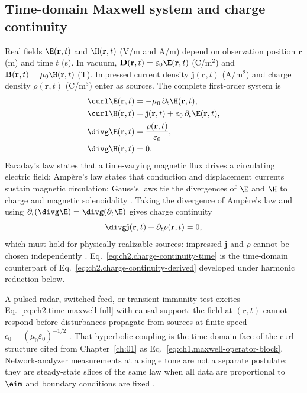 
\subsection{Time-domain Maxwell system and charge continuity}
\label{sec:ch02.2.3}

Real fields $\E(\mathbf{r},t)$ and $\H(\mathbf{r},t)$ (V/m and A/m) depend on observation position $\mathbf{r}$ (m) and time $t$ (s). In vacuum, $\mathbf{D}(\mathbf{r},t)=\varepsilon_0\E(\mathbf{r},t)$ (C/m$^2$) and $\mathbf{B}(\mathbf{r},t)=\mu_0\H(\mathbf{r},t)$ (T). Impressed current density $\mathbf{j}(\mathbf{r},t)$ (A/m$^2$) and charge density $\rho(\mathbf{r},t)$ (C/m$^3$) enter as sources. The complete first-order system is \cite{maxwell1873,stratton1941}
\begin{equation}
\label{eq:ch2.time-maxwell-full}
\begin{aligned}
\curl\E(\mathbf{r},t)&=-\mu_0\,\partial_t\H(\mathbf{r},t),\\
\curl\H(\mathbf{r},t)&=\mathbf{j}(\mathbf{r},t)+\varepsilon_0\,\partial_t\E(\mathbf{r},t),\\
\divg\E(\mathbf{r},t)&=\frac{\rho(\mathbf{r},t)}{\varepsilon_0},\\
\divg\H(\mathbf{r},t)&=0.
\end{aligned}
\end{equation}
Faraday's law states that a time-varying magnetic flux drives a circulating electric field; Amp\`ere's law states that conduction and displacement currents sustain magnetic circulation; Gauss's laws tie the divergences of $\E$ and $\H$ to charge and magnetic solenoidality \cite{maxwell1873}. Taking the divergence of Amp\`ere's law and using $\partial_t(\divg\E)=\divg(\partial_t\E)$ gives charge continuity
\begin{equation}
\label{eq:ch2.charge-continuity-time}
\divg\mathbf{j}(\mathbf{r},t)+\partial_t\rho(\mathbf{r},t)=0,
\end{equation}
which must hold for physically realizable sources: impressed $\mathbf{j}$ and $\rho$ cannot be chosen independently \cite{maxwell1873}. Eq.~\eqref{eq:ch2.charge-continuity-time} is the time-domain counterpart of Eq.~\eqref{eq:ch2.charge-continuity-derived} developed under harmonic reduction below.

A pulsed radar, switched feed, or transient immunity test excites Eq.~\eqref{eq:ch2.time-maxwell-full} with causal support: the field at $(\mathbf{r},t)$ cannot respond before disturbances propagate from sources at finite speed $c_0=(\mu_0\varepsilon_0)^{-1/2}$ \cite{maxwell1873,jackson1999}. That hyperbolic coupling is the time-domain face of the curl structure cited from Chapter~\ref{ch:01} as Eq.~\eqref{eq:ch1.maxwell-operator-block}. Network-analyzer measurements at a single tone are not a separate postulate: they are steady-state slices of the same law when all data are proportional to $\eim$ and boundary conditions are fixed \cite{stratton1941,harrington2001}.

